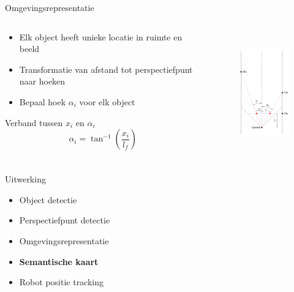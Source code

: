 \documentclass[11pt,t]{beamer}
\begin{document}
\begin{frame}[fragile]{Omgevingsrepresentatie}
	\begin{columns}[t]
		\begin{column}{.5\textwidth}
			\begin{itemize}
				\item Elk object heeft unieke locatie in ruimte en beeld
				\item Transformatie van afstand tot perspectiefpunt naar hoeken
				\item Bepaal hoek $\alpha_i$ voor elk object
			\end{itemize}

			\begin{block}{Verband tussen $x_i$ en $\alpha_i$}
				\[
					\alpha_i = \tan^{-1}(\frac{x_i}{l_f})
				\]
			\end{block}
		\end{column}
		\begin{column}{.5\textwidth}
			\begin{figure}
				\centering
				\includegraphics[height=200px]{graphics/omgeving.png}
			\end{figure}
		\end{column}
	\end{columns}	
\end{frame}

%
%
\begin{frame}[fragile]{Uitwerking}
	\begin{itemize}
		\item Object detectie
		\item Perspectiefpunt detectie
		\item Omgevingsrepresentatie
		\item \textbf{Semantische kaart}
		\item Robot positie tracking
	\end{itemize}
\end{frame}
\end{document}
